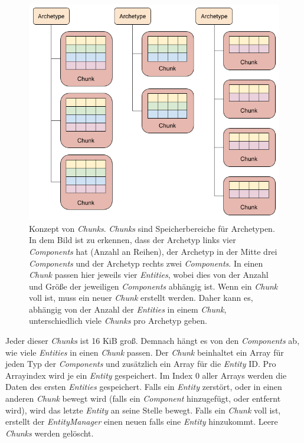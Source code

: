 \begin{figure}[H]
\begin{center}
\includegraphics[scale=0.45]{Bilder/ArchetypeChunkDiagram.png}
\caption{Konzept von \textit{Chunks}. \textit{Chunks} sind Speicherbereiche für Archetypen. In dem Bild ist zu erkennen, dass der Archetyp links vier \textit{Components} hat (Anzahl an Reihen), der Archetyp in der Mitte drei \textit{Components} und der Archetyp rechts zwei \textit{Components}. In einen \textit{Chunk} passen hier jeweils vier \textit{Entities}, wobei dies von der Anzahl und Größe der jeweiligen \textit{Components} abhängig ist. Wenn ein \textit{Chunk} voll ist, muss ein neuer \textit{Chunk} erstellt werden. Daher kann es, abhängig von der Anzahl der \textit{Entities} in einem \textit{Chunk}, unterschiedlich viele \textit{Chunks} pro Archetyp geben.}
\label{fig:archetyp_chunks}
\end{center}
\end{figure}
Jeder dieser \textit{Chunks} ist 16 KiB groß. Demnach hängt es von den \textit{Components} ab, wie viele \textit{Entities} in einen \textit{Chunk} passen. Der \textit{Chunk} beinhaltet ein Array für jeden Typ der \textit{Components} und zusätzlich ein Array für die \textit{Entity} ID. Pro Arrayindex wird je ein \textit{Entity} gespeichert. Im Index 0 aller Arrays werden die Daten des ersten \textit{Entities} gespeichert. Falls ein \textit{Entity} zerstört, oder in einen anderen \textit{Chunk} bewegt wird (falls ein \textit{Component} hinzugefügt, oder entfernt wird), wird das letzte \textit{Entity} an seine Stelle bewegt. Falls ein \textit{Chunk} voll ist, erstellt der \textit{EntityManager} einen neuen falls eine \textit{Entity} hinzukommt. Leere \textit{Chunks} werden gelöscht.
